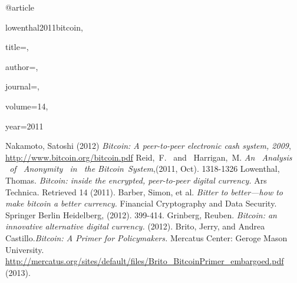 @article{lowenthal2011bitcoin,

 title={},

 author={},

 journal={},

 volume={14},

 year={2011}

}




%
\begin{thebibliography}{99}
Nakamoto, Satoshi (2012) {\em Bitcoin: A peer-to-peer electronic cash system, 2009}, \url{http://www.bitcoin.org/bitcoin.pdf}
Reid, F.  and  Harrigan, M. {\em  An  Analysis  of  Anonymity  in  the  Bitcoin System},(2011, Oct). 1318-1326
Lowenthal, Thomas. {\em Bitcoin: inside the encrypted, peer-to-peer digital currency.} Ars Technica. Retrieved 14 (2011).
Barber, Simon, et al. {\em Bitter to better—how to make bitcoin a better currency.} Financial Cryptography and Data Security. Springer Berlin Heidelberg, (2012). 399-414.
Grinberg, Reuben. {\em Bitcoin: an innovative alternative digital currency.} (2012).
Brito, Jerry, and Andrea Castillo.{\em Bitcoin: A Primer for Policymakers.} Mercatus Center: Geroge Mason University. \url{http://mercatus.org/sites/default/files/Brito_BitcoinPrimer_embargoed.pdf} (2013).
\end{thebibliography}